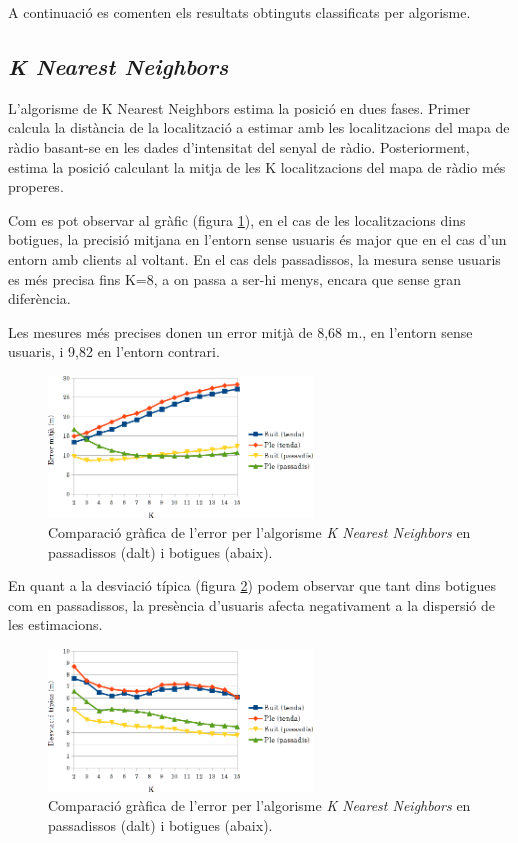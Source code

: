 A continuació es comenten els resultats obtinguts classificats per algorisme.

\subsection{\textit{K Nearest Neighbors}}

L'algorisme de K Nearest Neighbors estima la posició en dues fases. Primer calcula la distància de la localització a estimar amb les localitzacions del mapa de ràdio basant-se en les dades d'intensitat del senyal de ràdio. Posteriorment, estima la posició calculant la mitja de les K localitzacions del mapa de ràdio més properes.

Com es pot observar al gràfic (figura \ref{fig:grafic_mitja_KNN}), en el cas de les localitzacions dins botigues, la precisió mitjana en l'entorn sense usuaris és major que en el cas d'un entorn amb clients al voltant. En el cas dels passadissos, la mesura sense usuaris es més precisa fins K=8, a on passa a ser-hi menys, encara que sense gran diferència.

Les mesures més precises donen un error mitjà de 8,68 m., en l'entorn sense usuaris, i 9,82 en l'entorn contrari.

\begin{figure}[ht]
\begin{center}
\includegraphics[width=7cm]{imatges/knn_mitja.png}
\caption{Comparació gràfica de l'error per l'algorisme \textit{K Nearest Neighbors} en passadissos (dalt) i botigues (abaix).}
\label{fig:grafic_mitja_KNN}
\end{center}
\end{figure}

En quant a la desviació típica (figura \ref{fig:grafic_desviacio_KNN}) podem observar que tant dins botigues com en passadissos, la presència d'usuaris afecta negativament a la dispersió de les estimacions.

\begin{figure}[ht]
\begin{center}
\includegraphics[width=7cm]{imatges/knn_desviacio.png}
\caption{Comparació gràfica de l'error per l'algorisme \textit{K Nearest Neighbors} en passadissos (dalt) i botigues (abaix).}
\label{fig:grafic_desviacio_KNN}
\end{center}
\end{figure}


